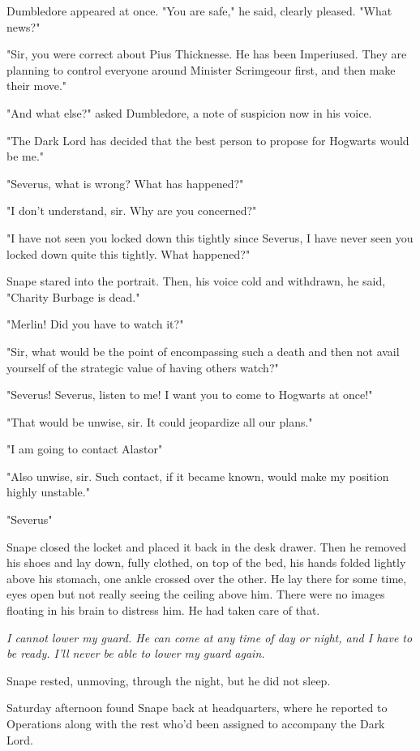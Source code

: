 Dumbledore appeared at once. "You are safe," he said, clearly pleased. "What news?"

"Sir, you were correct about Pius Thicknesse. He has been Imperiused. They are planning to control everyone around Minister Scrimgeour first, and then make their move."

"And what else?" asked Dumbledore, a note of suspicion now in his voice.

"The Dark Lord has decided that the best person to propose for Hogwarts would be me."

"Severus, what is wrong? What has happened?"

"I don't understand, sir. Why are you concerned?"

"I have not seen you locked down this tightly since{\el} Severus, I have never seen you locked down quite this tightly. What happened?"

Snape stared into the portrait. Then, his voice cold and withdrawn, he said, "Charity Burbage is dead."

"Merlin! Did you have to watch it?"

"Sir, what would be the point of encompassing such a death and then not avail yourself of the strategic value of having others watch?"

"Severus! Severus, listen to me! I want you to come to Hogwarts at once!"

"That would be unwise, sir. It could jeopardize all our plans."

"I am going to contact Alastor{\el}"

"Also unwise, sir. Such contact, if it became known, would make my position highly unstable."

"Severus{\el}"

Snape closed the locket and placed it back in the desk drawer. Then he removed his shoes and lay down, fully clothed, on top of the bed, his hands folded lightly above his stomach, one ankle crossed over the other. He lay there for some time, eyes open but not really seeing the ceiling above him. There were no images floating in his brain to distress him. He had taken care of that.

\emph{I cannot lower my guard. He can come at any time of day or night, and I have to be ready. I'll never be able to lower my guard again.}

Snape rested, unmoving, through the night, but he did not sleep.

Saturday afternoon found Snape back at headquarters, where he reported to Operations along with the rest who'd been assigned to accompany the Dark Lord.

